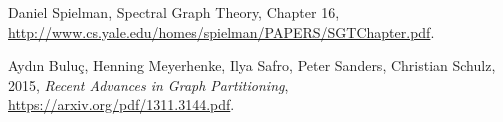 \documentclass{article}
\begin{document}

\begin{thebibliography}{99}

 Daniel Spielman, Spectral Graph Theory, Chapter 16,
	\url{http://www.cs.yale.edu/homes/spielman/PAPERS/SGTChapter.pdf}.

 Aydın Buluç, Henning Meyerhenke, Ilya Safro, Peter Sanders, Christian Schulz,
	2015, \textit{Recent Advances in Graph Partitioning},
	\url{https://arxiv.org/pdf/1311.3144.pdf}.




\end{thebibliography}

\end{document}
